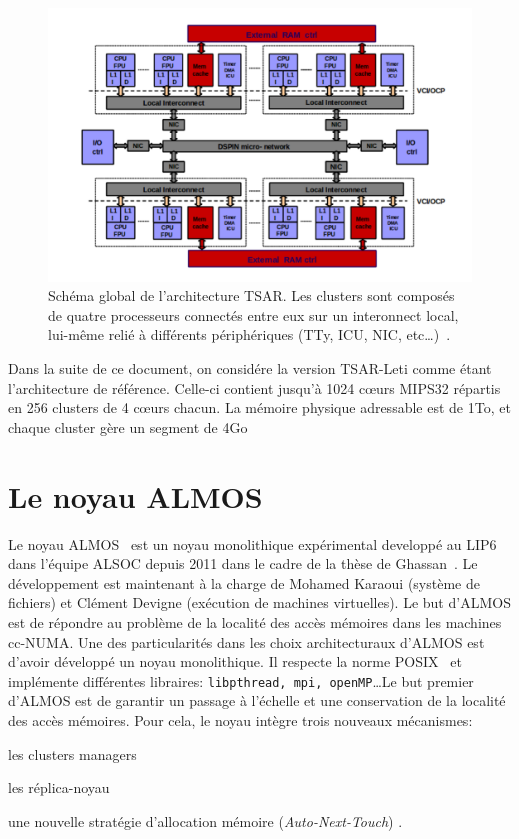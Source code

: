     \begin{figure}[ht]
      \centering \includegraphics[scale=0.241]{include/img/tsar.png}
      \caption{Schéma global de l'architecture TSAR. Les clusters sont composés
        de quatre processeurs connectés entre eux sur un interonnect local,
        lui-même relié à différents périphériques (TTy, ICU, NIC,
        etc\ldots)~\citep{greiner2009tsar}.}
      \label{fig:tsar}
    \end{figure}
     

    Dans la suite de ce document, on considére la version TSAR-Leti comme étant
    l'architecture de référence. Celle-ci contient jusqu'à 1024 c\oe urs MIPS32
    répartis en 256 clusters de 4 c\oe urs chacun. La mémoire physique
    adressable est de 1To, et chaque cluster gère un segment de 4Go


  \section{Le noyau ALMOS}
  \label{sec:almos}

    Le noyau ALMOS~\cite{almaless2011almos,almaless2014universite} est un noyau
    monolithique expérimental developpé au LIP6 dans l'équipe ALSOC depuis 2011
    dans le cadre de la thèse de Ghassan~\citeauthor{almaless2014universite}. Le
    développement est maintenant à la charge de Mohamed Karaoui (système de
    fichiers) et Clément Devigne (exécution de machines virtuelles). Le but
    d'ALMOS est de répondre au problème de la localité des accès mémoires dans
    les machines cc-NUMA. Une des particularités dans les choix architecturaux
    d'ALMOS est d'avoir développé un noyau monolithique. Il respecte la norme
    POSIX~\cite{posix2013} et implémente différentes libraires:
    \texttt{libpthread, mpi, openMP}\ldots Le but premier d'ALMOS est de
    garantir un passage à l'échelle et une conservation de la localité des accès
    mémoires. Pour cela, le noyau intègre trois nouveaux mécanismes:
    \benumline \item les clusters managers \item les réplica-noyau \item une
    nouvelle stratégie d'allocation mémoire (\textit{Auto-Next-Touch})
    \eenumline.

